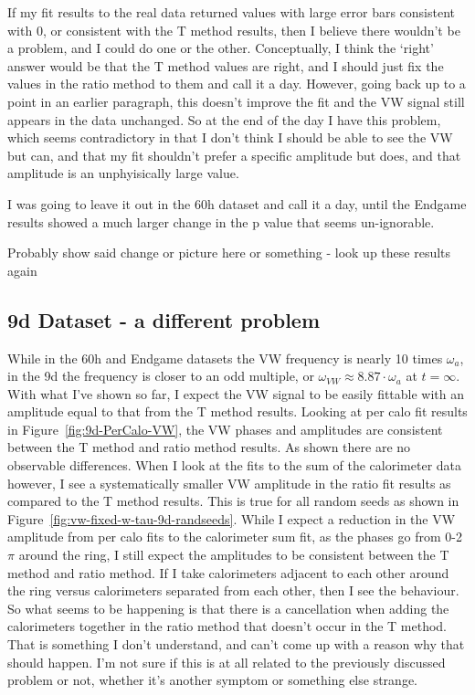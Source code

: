 \documentclass[12pt,letterpaper]{article}
\newcommand{\figref}[1]{Figure~\ref{#1}}
\def\wa{$\omega_{a}$\xspace}
\begin{document}
If my fit results to the real data returned values with large error bars consistent with 0, or consistent with the T method results, then I believe there wouldn't be a problem, and I could do one or the other. Conceptually, I think the `right' answer would be that the T method values are right, and I should just fix the values in the ratio method to them and call it a day. However, going back up to a point in an earlier paragraph, this doesn't improve the fit and the VW signal still appears in the data unchanged. So at the end of the day I have this problem, which seems contradictory in that I don't think I should be able to see the VW but can, and that my fit shouldn't prefer a specific amplitude but does, and that amplitude is an unphyisically large value. 


I was going to leave it out in the 60h dataset and call it a day, until the Endgame results showed a much larger change in the p value that seems un-ignorable.


Probably show said change or picture here or something - look up these results again






\subsection*{9d Dataset - a different problem}


While in the 60h and Endgame datasets the VW frequency is nearly 10 times \wa, in the 9d the frequency is closer to an odd multiple, or $\omega_{VW} \approx 8.87 \cdot \omega_{a}$ at $t = \infty$. With what I've shown so far, I expect the VW signal to be easily fittable with an amplitude equal to that from the T method results. Looking at per calo fit results in \figref{fig:9d-PerCalo-VW}, the VW phases and amplitudes are consistent between the T method and ratio method results. As shown there are no observable differences. When I look at the fits to the sum of the calorimeter data however, I see a systematically smaller VW amplitude in the ratio fit results as compared to the T method results. This is true for all random seeds as shown in \figref{fig:vw-fixed-w-tau-9d-randseeds}. While I expect a reduction in the VW amplitude from per calo fits to the calorimeter sum fit, as the phases go from 0-2$\pi$ around the ring, I still expect the amplitudes to be consistent between the T method and ratio method. If I take calorimeters adjacent to each other around the ring versus calorimeters separated from each other, then I see the behaviour. So what seems to be happening is that there is a cancellation when adding the calorimeters together in the ratio method that doesn't occur in the T method. That is something I don't understand, and can't come up with a reason why that should happen. I'm not sure if this is at all related to the previously discussed problem or not, whether it's another symptom or something else strange. 
\end{document}
